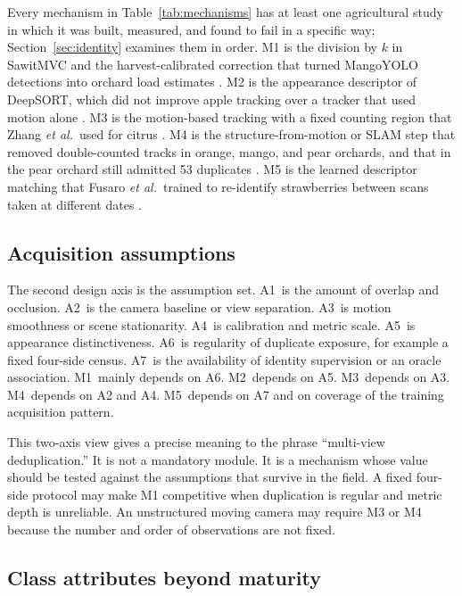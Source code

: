 Every mechanism in Table~\ref{tab:mechanisms} has at least one agricultural study in which it was built, measured, and found to fail in a specific way; Section~\ref{sec:identity} examines them in order. M1 is the division by $k$ in SawitMVC and the harvest-calibrated correction that turned MangoYOLO detections into orchard load estimates \cite{indriani2026sawitmvc,koirala2019deepfruit}. M2 is the appearance descriptor of DeepSORT, which did not improve apple tracking over a tracker that used motion alone \cite{ledger_r_2d972b94554c6cd1}. M3 is the motion-based tracking with a fixed counting region that Zhang \textit{et al.}\ used for citrus \cite{ledger_r_ee550a3e3a6fb318}. M4 is the structure-from-motion or SLAM step that removed double-counted tracks in orange, mango, and pear orchards, and that in the pear orchard still admitted 53 duplicates \cite{ledger_m_9966d81433d61ed3,ledger_r_00f82e0f404d691b,ledger_r_d4270ea8ab11f268}. M5 is the learned descriptor matching that Fusaro \textit{et al.}\ trained to re-identify strawberries between scans taken at different dates \cite{ledger_r_0eda6374aaf85fae}.


\subsection{Acquisition assumptions}

The second design axis is the assumption set. A1~is the amount of overlap and occlusion. A2~is the camera baseline or view separation. A3~is motion smoothness or scene stationarity. A4~is calibration and metric scale. A5~is appearance distinctiveness. A6~is regularity of duplicate exposure, for example a fixed four-side census. A7~is the availability of identity supervision or an oracle association. M1~mainly depends on A6. M2~depends on A5. M3~depends on A3. M4~depends on A2 and A4. M5~depends on A7 and on coverage of the training acquisition pattern.

This two-axis view gives a precise meaning to the phrase ``multi-view deduplication.'' It is not a mandatory module. It is a mechanism whose value should be tested against the assumptions that survive in the field. A fixed four-side protocol may make M1 competitive when duplication is regular and metric depth is unreliable. An unstructured moving camera may require M3 or M4 because the number and order of observations are not fixed.

\subsection{Class attributes beyond maturity}


